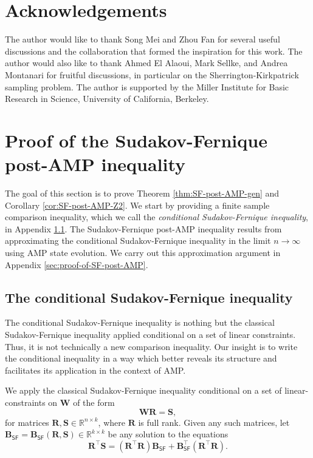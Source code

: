 \documentclass[]{article}
\def\bR{{\boldsymbol R}}
\def\bW{{\boldsymbol W}}
\def\bS{\boldsymbol{S}}
\def\bB{{\boldsymbol B}}
\def\reals{{\mathbb R}}
\def\bW{{\boldsymbol W}}
\def\SF{\mathsf{SF}}
\begin{document}
\section*{Acknowledgements}

The author would like to thank Song Mei and Zhou Fan for several useful discussions and the collaboration that formed the inspiration for this work. 
The author would also like to thank Ahmed El Alaoui, Mark Sellke, and Andrea Montanari for fruitful discussions, in particular on the Sherrington-Kirkpatrick sampling problem.
The author is supported by the Miller Institute for
Basic Research in Science, University of California, Berkeley.




\newpage
\appendix

\section{Proof of the Sudakov-Fernique post-AMP inequality}
\label{sec:app-proof-of-SF-post-AMP}

The goal of this section is to prove Theorem \ref{thm:SF-post-AMP-gen} and Corollary \ref{cor:SF-post-AMP-Z2}.
We start by providing a finite sample comparison inequality, which we call the \emph{conditional Sudakov-Fernique inequality},
in Appendix \ref{sec:conditional-SF}.
The Sudakov-Fernique post-AMP inequality results from approximating the conditional Sudakov-Fernique inequality in the limit $n \rightarrow \infty$ using AMP state evolution.
We carry out this approximation argument in Appendix \ref{sec:proof-of-SF-post-AMP}.

\subsection{The conditional Sudakov-Fernique inequality}
\label{sec:conditional-SF}

The conditional Sudakov-Fernique inequality is nothing but the classical Sudakov-Fernique inequality applied conditional on a set of linear constraints.
Thus, it is not technically a new comparison inequality.
Our insight is to write the conditional inequality in a way which better reveals its structure and facilitates its application in the context of AMP.

We apply the classical Sudakov-Fernique inequality conditional on a set of linear-constraints on $\bW$ of the form
\begin{equation}
    \bW \bR = \bS,
\end{equation}
for matrices $\bR,\bS \in \reals^{n \times k}$,
where $\bR$ is full rank.
Given any such matrices, 
let $\bB_{\SF} = \bB_{\SF}(\bR,\bS) \in \reals^{k \times k}$ be any solution to the equations
\begin{equation}
\label{eq:B-def}
    \bR^\top \bS = (\bR^\top \bR) \bB_{\SF} + \bB_{\SF}^\top (\bR^\top \bR).
\end{equation}
\end{document}
